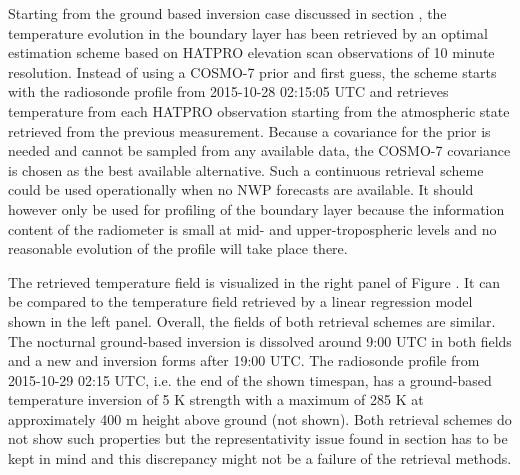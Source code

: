 \stopsubsection

\startsubsection[title={Boundary Layer Evolution}]

    Starting from the ground based inversion case discussed in section
    \in[ch_gbinv], the temperature evolution in the boundary layer has been
    retrieved by an optimal estimation scheme based on HATPRO elevation scan
    observations of 10 minute resolution. Instead of using a COSMO-7 prior
    and first guess, the scheme starts with the radiosonde profile from
    2015-10-28 02:15:05 UTC and retrieves temperature from each HATPRO
    observation starting from the atmospheric state retrieved from the previous
    measurement. Because a covariance for the prior is needed and cannot be
    sampled from any available data, the COSMO-7 covariance is chosen as the
    best available alternative. Such a continuous retrieval scheme could be
    used operationally when no NWP forecasts are available. It should however
    only be used for profiling of the boundary layer because the information
    content of the radiometer is small at mid- and upper-tropospheric levels
    and no reasonable evolution of the profile will take place there.

    The retrieved temperature field is visualized in the right panel of Figure
    . It can be compared to the temperature field
    retrieved by a linear regression model shown in the left panel. Overall,
    the fields of both retrieval schemes are similar. The nocturnal
    ground-based inversion is dissolved around 9:00 UTC in both fields and
    a new and inversion forms after 19:00 UTC. The radiosonde profile from
    2015-10-29 02:15 UTC, i.e. the end of the shown timespan, has
    a ground-based temperature inversion of 5 K strength with a maximum of 285
    K at approximately 400 m height above ground (not shown). Both retrieval
    schemes do not show such properties but the representativity issue
    found in section \in[ch:hatproeval] has to be kept in mind and this
    discrepancy might not be a failure of the retrieval methods.

        {}


